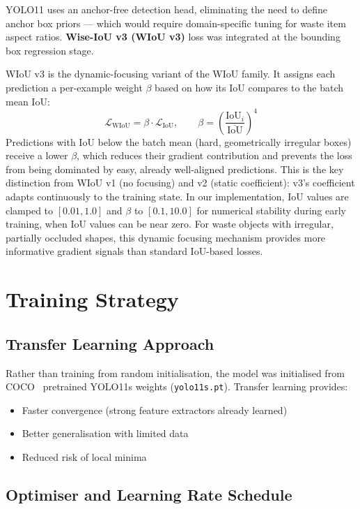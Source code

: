 YOLO11 uses an anchor-free detection head, eliminating the need to define anchor box priors — which would require domain-specific tuning for waste item aspect ratios. \textbf{Wise-IoU v3 (WIoU v3)} loss \cite{wiou2023} was integrated at the bounding box regression stage.

WIoU v3 is the dynamic-focusing variant of the WIoU family. It assigns each prediction a per-example weight $\beta$ based on how its IoU compares to the batch mean IoU:
\begin{equation}
\mathcal{L}_{\text{WIoU}} = \beta \cdot \mathcal{L}_{\text{IoU}}, \qquad
\beta = \left(\frac{\text{IoU}_i}{\overline{\text{IoU}}}\right)^{\!4}
\end{equation}
Predictions with IoU below the batch mean (hard, geometrically irregular boxes) receive a lower $\beta$, which reduces their gradient contribution and prevents the loss from being dominated by easy, already well-aligned predictions. This is the key distinction from WIoU v1 (no focusing) and v2 (static coefficient): v3's coefficient adapts continuously to the training state. In our implementation, IoU values are clamped to $[0.01, 1.0]$ and $\beta$ to $[0.1, 10.0]$ for numerical stability during early training, when IoU values can be near zero. For waste objects with irregular, partially occluded shapes, this dynamic focusing mechanism provides more informative gradient signals than standard IoU-based losses.

\section{Training Strategy}

\subsection{Transfer Learning Approach}

Rather than training from random initialisation, the model was initialised from COCO~\cite{lin2014coco} pretrained YOLO11s weights (\texttt{yolo11s.pt}). Transfer learning provides:
\begin{itemize}
    \item Faster convergence (strong feature extractors already learned)
    \item Better generalisation with limited data
    \item Reduced risk of local minima
\end{itemize}

\subsection{Optimiser and Learning Rate Schedule}

